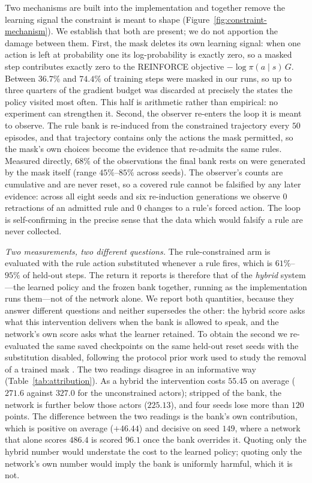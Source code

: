 \documentclass[11pt]{article}
\begin{document}
Two mechanisms are built into the implementation and together remove the learning signal the
constraint is meant to shape (Figure~\ref{fig:constraint-mechanism}). We establish that both are
present; we do not apportion the damage between them. First, the mask deletes its own learning
signal: when one action is left at probability one its log-probability is exactly zero, so a masked
step contributes exactly zero to the REINFORCE objective $-\log\pi(a\mid s)\,G$. Between $36.7\%$ and
$74.4\%$ of training steps were masked in our runs, so up to three quarters of the gradient budget
was discarded at precisely the states the policy visited most often. This half is arithmetic rather
than empirical: no experiment can strengthen it. Second, the observer re-enters the loop it is meant
to observe. The rule bank is re-induced from the constrained trajectory every $50$ episodes, and that
trajectory contains only the actions the mask permitted, so the mask's own choices become the
evidence that re-admits the same rules. Measured directly, $68\%$ of the observations the final bank
rests on were generated by the mask itself (range $45\%$--$85\%$ across seeds). The observer's counts
are cumulative and are never reset, so a covered rule cannot be falsified by any later evidence:
across all eight seeds and six re-induction generations we observe $0$ retractions of an admitted
rule and $0$ changes to a rule's forced action. The loop is self-confirming in the precise sense that
the data which would falsify a rule are never collected.

\emph{Two measurements, two different questions.} The rule-constrained arm is evaluated with the rule
action substituted whenever a rule fires, which is $61\%$--$95\%$ of held-out steps. The return it
reports is therefore that of the \emph{hybrid} system---the learned policy and the frozen bank
together, running as the implementation runs them---not of the network alone. We report both
quantities, because they answer different questions and neither supersedes the other: the hybrid
score asks what this intervention delivers when the bank is allowed to speak, and the network's own
score asks what the learner retained. To obtain the second we re-evaluated the same saved checkpoints
on the same held-out reset seeds with the substitution disabled, following the protocol prior work
used to study the removal of a trained mask \cite{huang2022masking}. The two readings disagree in an
informative way (Table~\ref{tab:attribution}). As a hybrid the intervention costs $55.45$ on average
($271.6$ against $327.0$ for the unconstrained actors); stripped of the bank, the network is further
below those actors ($225.13$), and four seeds lose more than $120$ points. The difference between the
two readings is the bank's own contribution, which is positive on average ($+46.44$) and decisive on
seed $149$, where a network that alone scores $486.4$ is scored $96.1$ once the bank overrides it.
Quoting only the hybrid number would understate the cost to the learned policy; quoting only the
network's own number would imply the bank is uniformly harmful, which it is not.
\end{document}

